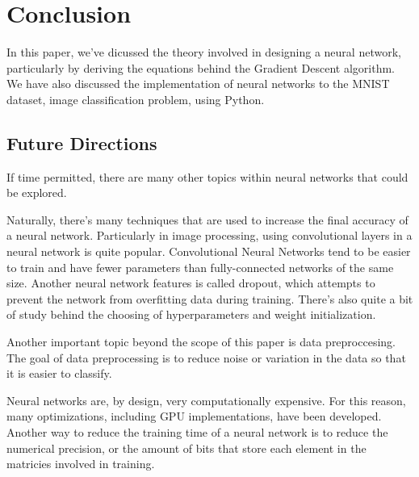 \newpage
\section{Conclusion}

In this paper, we've dicussed the theory involved in designing a neural
network, particularly by deriving the equations behind the Gradient Descent
algorithm.
We have also discussed the implementation of neural networks to the MNIST
dataset, image classification problem, using Python.


\subsection{Future Directions}
If time permitted, there are many other topics within neural networks that
could be explored.

Naturally, there's many techniques that are used to increase the final accuracy
of a neural network. Particularly in image processing, using convolutional
layers in a neural network is quite popular. Convolutional Neural Networks tend
to be easier to train and have fewer parameters than fully-connected networks
of the same size. 
Another neural network features is called dropout, which attempts to prevent
the network from overfitting data during training.
There's also quite a bit of study behind the choosing of hyperparameters and
weight initialization.

Another important topic beyond the scope of this paper is data preproccesing. 
The goal of data preprocessing is to reduce noise or variation in the data so
that it is easier to classify.

Neural networks are, by design, very computationally expensive. For this
reason, many optimizations, including GPU implementations, have been developed.
Another way to reduce the training time of a neural network is to reduce the
numerical precision, or the amount of bits that store each element in the
matricies involved in training.
